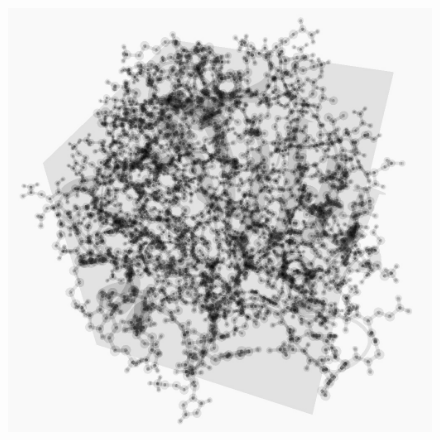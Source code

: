 \documentclass{egpubl}
\newlength{\boxheight}
\begin{document}
\begin{figure}[tcb]
\begin{minipage}[b][\boxheight][b]{0.24\linewidth}
\begin{minipage}[b]{0.98\linewidth}
    \end{minipage}%
  \end{minipage}%
  \hfill%
  \usebox\savedProteinBox
  \hfill%
  \begin{minipage}[b][\boxheight][b]{0.24\linewidth}
    \centering%
    \begin{minipage}[t]{0.98\linewidth}
      \centering
      \includegraphics[width=\linewidth]{snapshots/mol/cgf/dci-scaled-inv.jpg}
    \end{minipage}%
    \vfill%
    \begin{minipage}[b]{0.98\linewidth}
      \centering

\end{minipage}
\end{minipage}
\end{figure}
\end{document}
